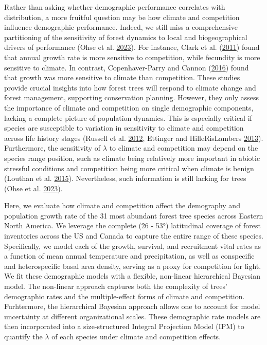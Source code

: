 \documentclass[12pt]{article}
\begin{document}
Rather than asking whether demographic performance correlates with
distribution, a more fruitful question may be how climate and
competition influence demographic performance. Indeed, we still miss a
comprehensive partitioning of the sensitivity of forest dynamics to
local and biogeographical drivers of performance (Ohse et al.
\protect\hyperlink{ref-Ohse2023}{2023}). For instance, Clark et al.
(\protect\hyperlink{ref-Clark2011}{2011}) found that annual growth rate
is more sensitive to competition, while fecundity is more sensitive to
climate. In contrast, Copenhaver-Parry and Cannon
(\protect\hyperlink{ref-CopenhaverParry2016}{2016}) found that growth
was more sensitive to climate than competition. These studies provide
crucial insights into how forest trees will respond to climate change
and forest management, supporting conservation planning. However, they
only assess the importance of climate and competition on single
demographic components, lacking a complete picture of population
dynamics. This is especially critical if species are susceptible to
variation in sensitivity to climate and competition across life history
stages (Russell et al. \protect\hyperlink{ref-Russell2012}{2012},
Ettinger and HilleRisLambers
\protect\hyperlink{ref-Ettinger2013}{2013}). Furthermore, the
sensitivity of \(\lambda\) to climate and competition may depend on the
species range position, such as climate being relatively more important
in abiotic stressful conditions and competition being more critical when
climate is benign (Louthan et al.
\protect\hyperlink{ref-Louthan2015}{2015}). Nevertheless, such
information is still lacking for trees (Ohse et al.
\protect\hyperlink{ref-Ohse2023}{2023}).

Here, we evaluate how climate and competition affect the demography and
population growth rate of the 31 most abundant forest tree species
across Eastern North America. We leverage the complete (26 - 53°)
latitudinal coverage of forest inventories across the US and Canada to
capture the entire range of these species. Specifically, we model each
of the growth, survival, and recruitment vital rates as a function of
mean annual temperature and precipitation, as well as conspecific and
heterospecific basal area density, serving as a proxy for competition
for light. We fit these demographic models with a flexible, non-linear
hierarchical Bayesian model. The non-linear approach captures both the
complexity of trees' demographic rates and the multiple-effect forms of
climate and competition. Furhtermore, the hierarchical Bayesian approach
allows one to account for model uncertainty at different organizational
scales. These demographic rate models are then incorporated into a
size-structured Integral Projection Model (IPM) to quantify the
\(\lambda\) of each species under climate and competition effects.
\end{document}
